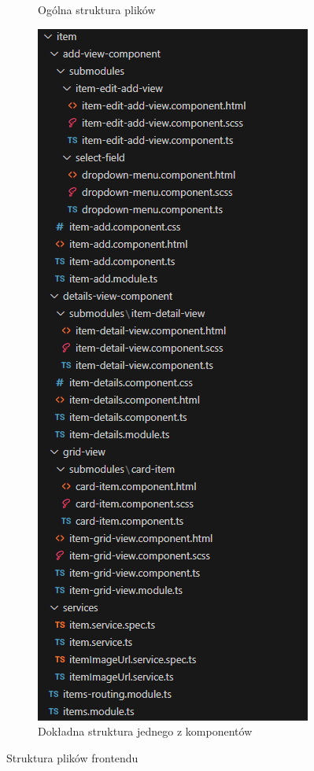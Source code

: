 \documentclass[../../main.tex]{subfiles}
\begin{document}
\begin{figure}[ht!]
\begin{subfigure}{.5\textwidth}
            \caption{Ogólna struktura plików}
            \label{fig:front-repo-structure-general}
        \end{subfigure}
        \begin{subfigure}{.5\textwidth}
            \centering
            \includegraphics[height=0.4\pdfpageheight]{images/frontend-repo-structure-feature.png}
            \caption{Dokładna struktura jednego z komponentów}
            \label{fig:front-repo-structure-feature}
        \end{subfigure}
        \caption{Struktura plików frontendu}
        \label{fig:frontend-repo-structure}
    \end{figure}
\end{document}
